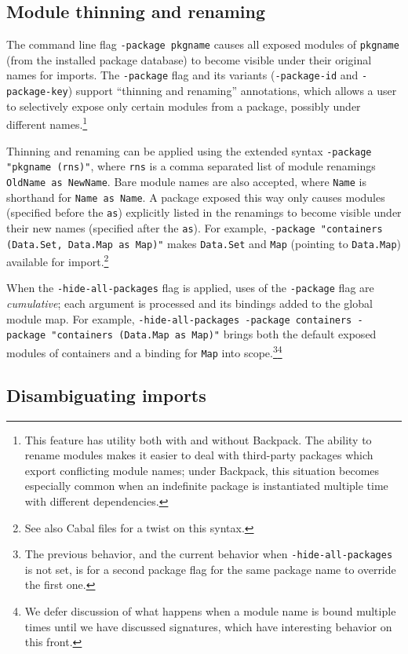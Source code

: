 \documentclass{article}
\begin{document}
\subsection{Module thinning and renaming}

The command line flag \texttt{-package pkgname} causes all
exposed modules of \texttt{pkgname} (from the installed package database) to become visible under their
original names for imports.
The \texttt{-package} flag and its variants (\texttt{-package-id} and
\texttt{-package-key}) support ``thinning and renaming''
annotations, which allows a user to selectively expose only certain
modules from a package, possibly under different names.\footnote{This
feature has utility both with and without Backpack.  The ability to
rename modules makes it easier to deal with third-party packages which
export conflicting module names; under Backpack, this situation becomes
especially common when an indefinite package is instantiated multiple
time with different dependencies.}

Thinning and renaming can be applied
using the extended syntax \verb|-package "pkgname (rns)"|, where \texttt{rns} is a comma separated list of
module renamings \texttt{OldName as NewName}.  Bare module names are
also accepted, where \texttt{Name} is shorthand for \texttt{Name as
Name}.  A package exposed this way only causes modules (specified before
the \texttt{as}) explicitly listed in the renamings to become visible
under their new names (specified after the \texttt{as}).  For example,
\verb|-package "containers (Data.Set, Data.Map as Map)"| makes
\texttt{Data.Set} and \texttt{Map} (pointing to
\texttt{Data.Map}) available for import.\footnote{See also Cabal files
for a twist on this syntax.}

When the \texttt{-hide-all-packages} flag is applied, uses of the
\texttt{-package} flag are \emph{cumulative}; each argument is processed
and its bindings added to the global module map.  For example,
\verb|-hide-all-packages -package containers -package "containers (Data.Map as Map)"| brings both the default exposed modules of
containers and a binding for \texttt{Map} into scope.\footnote{The
previous behavior, and the current behavior when
\texttt{-hide-all-packages} is not set, is for a second package flag for
the same package name to override the first one.}\footnote{We defer
discussion of what happens when a module name is bound multiple times until
we have discussed signatures, which have interesting behavior on this front.}

\subsection{Disambiguating imports}
\end{document}
